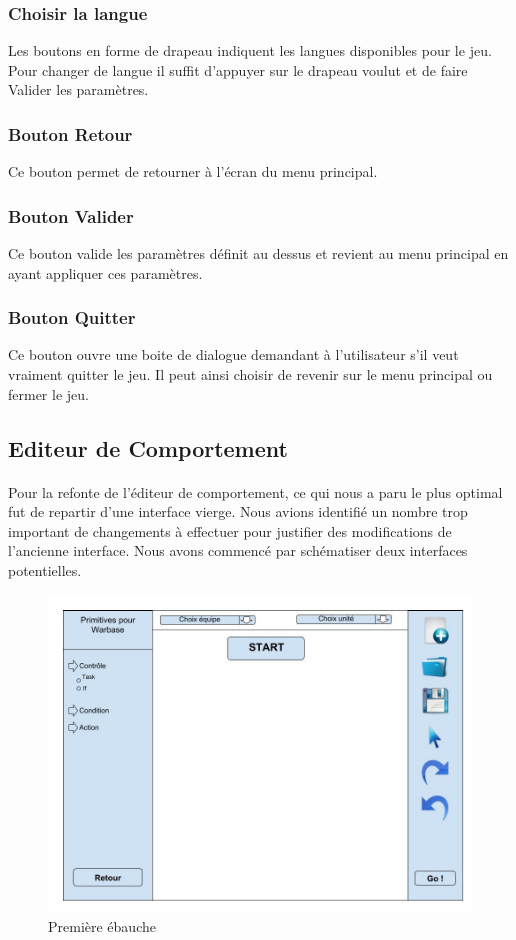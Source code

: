 \documentclass{report}
\begin{document}
\subsubsection{Choisir la langue}
Les boutons en forme de drapeau indiquent les langues disponibles pour le jeu. Pour changer de langue il suffit d'appuyer sur le drapeau voulut et de faire Valider les paramètres.
\subsubsection{Bouton Retour}
Ce bouton permet de retourner à l'écran du menu principal.
\subsubsection{Bouton Valider}
Ce bouton valide les paramètres définit au dessus et revient au menu principal en ayant appliquer ces paramètres.
\subsubsection{Bouton Quitter}
Ce bouton ouvre une boite de dialogue demandant à l'utilisateur s'il veut vraiment quitter le jeu. Il peut ainsi choisir de revenir sur le menu principal ou fermer le jeu.



\subsection{Editeur de Comportement}
\paragraph{}
Pour la refonte de l'éditeur de comportement, ce qui nous a paru le plus optimal fut de repartir d'une interface vierge. Nous avions identifié un nombre trop important de changements à effectuer pour justifier des modifications de l'ancienne interface.
Nous avons commencé par schématiser deux interfaces potentielles.
\begin{figure}[!h]
	\centering
		\includegraphics[scale=0.25]{ConceptionGraphique1}
	\caption{Première ébauche}
\end{figure}
\end{document}
